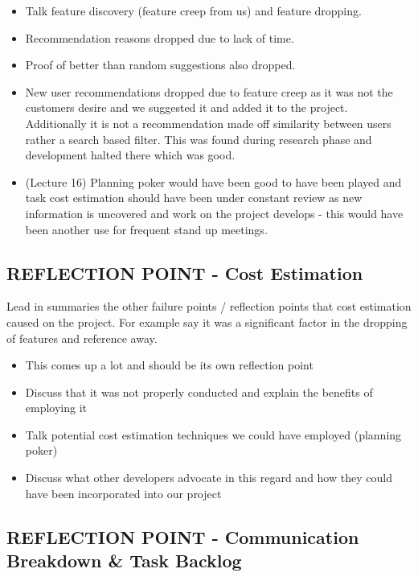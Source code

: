 \documentclass{l3proj}
\begin{document}
\begin{itemize}
\item Talk feature discovery (feature creep from us) and feature dropping.
\item Recommendation reasons dropped due to lack of time.
\item Proof of better than random suggestions also dropped.
\item New user recommendations dropped due to feature creep as it was not the customers desire and we suggested it and added it to the project. Additionally it is not a recommendation made off similarity between users rather a search based filter. This was found during research phase and development halted there which was good.
\item (Lecture 16) Planning poker would have been good to have been played and task cost estimation should have been under constant review as new information is uncovered and work on the project develops - this would have been another use for frequent stand up meetings.
\end{itemize}


\subsection{REFLECTION POINT - Cost Estimation}
\label{sec:droppingreflection}

Lead in summaries the other failure points / reflection points that cost estimation caused on the project. For example say it was a significant factor in the dropping of features and reference away. 

\begin{itemize}
\item This comes up a lot and should be its own reflection point
\item Discuss that it was not properly conducted and explain the benefits of employing it
\item Talk potential cost estimation techniques we could have employed (planning poker)
\item Discuss what other developers advocate in this regard and how they could have been incorporated into our project
\end{itemize}


\subsection{REFLECTION POINT - Communication Breakdown \& Task Backlog}
\label{sec:communicationbreakdown}
\end{document}
